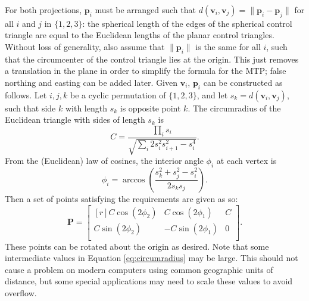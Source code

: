 \documentclass[]{interact}
\begin{document}
For both projections, $\mathbf p_i$ must be arranged such that
$d\left(\mathbf v_i, \mathbf v_j\right) = \|\mathbf p_i - \mathbf p_j\|$
for all $i$ and $j$ in $\{1, 2, 3\}$: the spherical length of the edges of the
spherical control triangle are equal to the Euclidean lengths of the planar
control triangles. Without loss of generality, also assume that
$\|\mathbf p_i\|$ is the same for all $i$, such that the circumcenter of the
control triangle lies at the origin. This just removes a translation in the
plane in order to simplify the formula for the MTP; false northing and easting
can be added later. Given $\mathbf v_i$, $\mathbf p_i$ can be constructed as
follows. Let $i, j, k$ be a cyclic permutation of $\{1, 2, 3\}$,
and let $s_k = d\left(\mathbf v_i, \mathbf v_j\right)$,
such that side $k$ with length $s_k$ is opposite point $k$. The circumradius
of the Euclidean triangle with sides of length $s_k$ is \citep{isaacs}
\begin{equation}\label{eq:circumradius}
  C = \frac{\prod_i s_i}{\sqrt{\sum_i 2 s_i^2 s_{i+1}^2 - s_i^4}}.
\end{equation}
From the (Euclidean) law of cosines,
the interior angle $\phi_i$ at each vertex is
\begin{equation}\label{eq:phi}
  \phi_i = \arccos \left( \frac{s_k^2 + s_j^2 - s_i^2}{2 s_k s_j}\right).
\end{equation}
Then a set of points satisfying the requirements are given as so:
\begin{equation}\label{eq:planarctrlpts}
  \mathbf P = \begin{bmatrix*}[r]
  C \cos \left(2 \phi_2 \right) &
  C \cos \left(2 \phi_1 \right) &
  C \\
  C \sin \left(2 \phi_2 \right) &
  -C \sin \left(2 \phi_1 \right) &
  0 \\
\end{bmatrix*}.
\end{equation}
These points can be rotated about the origin as desired. Note that some
intermediate values in Equation \ref{eq:circumradius} may be large. This
should not cause a problem on modern computers using common geographic
units of distance, but some special applications may need to scale these
values to avoid overflow.
\end{document}

